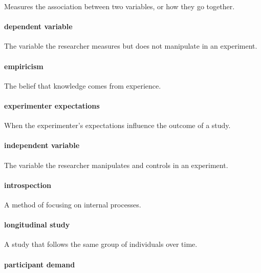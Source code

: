 \documentclass[
]{krantz}
\begin{document}
Measures the association between two variables, or how they go together.

\paragraph*{dependent variable}\label{dependent-variable}

The variable the researcher measures but does not manipulate in an experiment.

\paragraph*{empiricism}\label{empiricism}

The belief that knowledge comes from experience.

\paragraph*{experimenter expectations}\label{experimenter-expectations}

When the experimenter's expectations influence the outcome of a study.

\paragraph*{independent variable}\label{independent-variable}

The variable the researcher manipulates and controls in an experiment.

\paragraph*{introspection}\label{introspection}

A method of focusing on internal processes.

\paragraph*{longitudinal study}\label{longitudinal-study}

A study that follows the same group of individuals over time.

\paragraph*{participant demand}\label{participant-demand}
\end{document}
